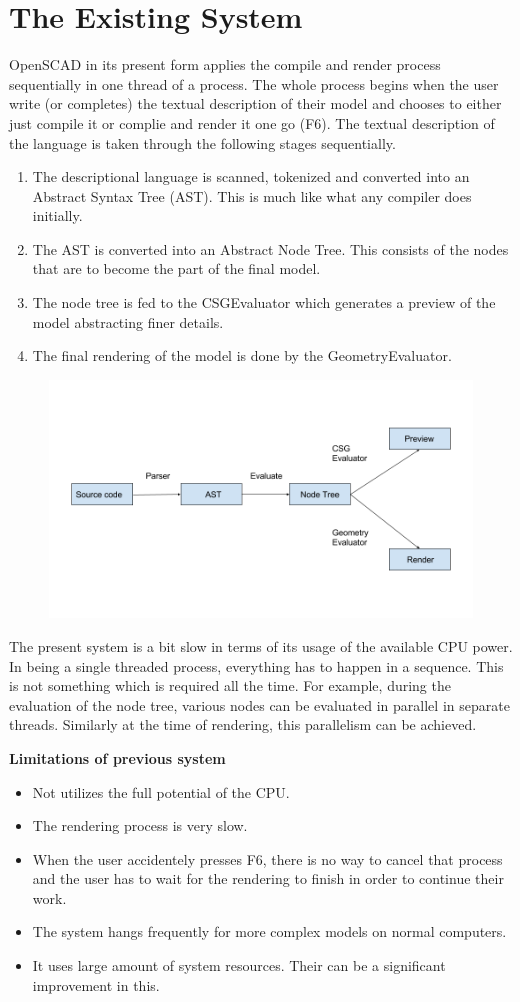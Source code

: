 \section{The Existing System}
OpenSCAD in its present form applies the compile and render process sequentially in one thread of a process. The whole process begins when the user write (or completes) the textual description of their model and chooses to either just compile it or complie and render it one go (F6). The textual description of the language is taken through the following stages sequentially.
\begin{enumerate}
	\item The descriptional language is scanned, tokenized and converted into an Abstract Syntax Tree (AST). This is much like what any compiler does initially.
	\item The AST is converted into an Abstract Node Tree. This consists of the nodes that are to become the part of the final model.
	\item The node tree is fed to the CSGEvaluator which generates a preview of the model abstracting finer details.
	\item The final rendering of the model is done by the GeometryEvaluator.
\end{enumerate}

\begin{figure}
\centering
\includegraphics[width=0.7\linewidth]{images/flowchart}
\caption{}
\label{fig:flowchart}
\end{figure}

The present system is a bit slow in terms of its usage of the available CPU power. In being a single threaded process, everything has to happen in a sequence. This is not something which is required all the time. For example, during the evaluation of the node tree, various nodes can be evaluated in parallel in separate threads. Similarly at the time of rendering, this parallelism can be achieved.

{\bf {Limitations of previous system }}
\begin{itemize}
	\item Not utilizes the full potential of the CPU.
	\item The rendering process is very slow.
	\item When the user accidentely presses F6, there is no way to cancel that process and the user has to wait for the rendering to finish in order to continue their work.
	\item The system hangs frequently for more complex models on normal computers.
	\item It uses large amount of system resources. Their can be a significant improvement in this.
\end{itemize}
